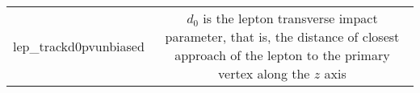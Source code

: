 \begin{table}[!htpb]
{\begin{tabular}{|c|c|}
lep\_trackd0pvunbiased & $d_0$ is the lepton transverse impact parameter, that is, the distance of closest approach of the lepton to the primary vertex along the $z$ axis \\

\end{tabular}}
\end{table}
